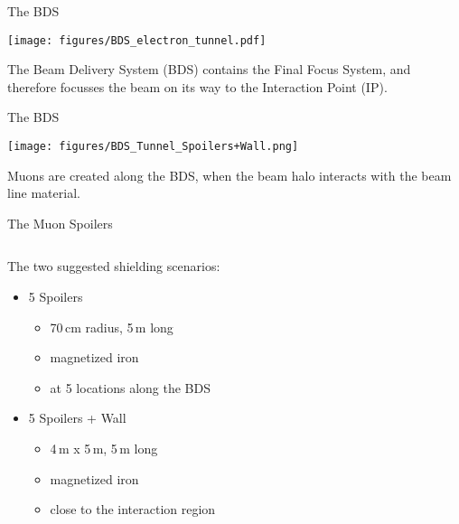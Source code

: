 \documentclass[xcolor={dvipsnames}]{beamer}
\begin{document}
\begin{frame}{The BDS}
\begin{center}
  \texttt{[image: figures/BDS\_electron\_tunnel.pdf]}
  \end{center}
The Beam Delivery System (BDS) contains the Final Focus System, and therefore focusses the beam on its way to the Interaction Point (IP).
\end{frame}
  \begin{frame}{The BDS}
\begin{center}
  \texttt{[image: figures/BDS\_Tunnel\_Spoilers+Wall.png]}
\end{center}
Muons are created along the BDS, when the beam halo interacts with the beam line material.
\end{frame}

\begin{frame}{The Muon Spoilers}
\begin{columns}
 \begin{column}{0.4\textwidth}
 The two suggested shielding scenarios:
  \begin{itemize}
   \item 5 Spoilers
   \begin{itemize}
    \item 70\,cm radius, 5\,m long
    \item magnetized iron
    \item at 5 locations along the BDS
   \end{itemize}
   \item 5 Spoilers + Wall
    \begin{itemize}
    \item 4\,m x 5\,m, 5\,m long
    \item magnetized iron
    \item close to the interaction region
   \end{itemize}
  \end{itemize}

 \end{column}
 \begin{column}{0.6\textwidth}
  \\\vspace*{0.3cm}
 \end{column}
\end{columns} 
\end{frame}
\end{document}
